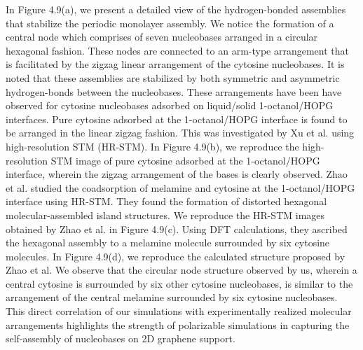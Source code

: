 In Figure 4.9(a), we present a detailed view of the hydrogen-bonded assemblies that stabilize the periodic monolayer assembly. We notice the formation of a central node which comprises of seven nucleobases arranged in a circular hexagonal fashion. These nodes are connected to an arm-type arrangement that is facilitated by the zigzag linear arrangement of the cytosine nucleobases. It is noted that these assemblies are stabilized by both symmetric and asymmetric hydrogen-bonds between the nucleobases. These arrangements have been have observed for cytosine nucleobases adsorbed on liquid/solid 1-octanol/HOPG interfaces.\supercite{zhao_investigating_2016,xu_coadsorption_2006} Pure cytosine adsorbed at the 1-octanol/HOPG interface is found to be arranged in the linear zigzag fashion. This was investigated by Xu et al. using high-resolution STM (HR-STM). In Figure 4.9(b), we reproduce the high-resolution STM image of pure cytosine adsorbed at the 1-octanol/HOPG interface, wherein the zigzag arrangement of the bases is clearly observed.\supercite{xu_coadsorption_2006} Zhao et al. studied the coadsorption of melamine and cytosine at the 1-octanol/HOPG interface using HR-STM. They found the formation of distorted hexagonal molecular-assembled island structures. We reproduce the HR-STM images obtained by Zhao et al. in Figure 4.9(c).\supercite{zhao_investigating_2016} Using DFT calculations, they ascribed the hexagonal assembly to a melamine molecule surrounded by six cytosine molecules. In Figure 4.9(d), we reproduce the calculated structure proposed by Zhao et al.\supercite{zhao_investigating_2016} We observe that the circular node structure observed by us, wherein a central cytosine is surrounded by six other cytosine nucleobases, is similar to the arrangement of the central melamine surrounded by six cytosine nucleobases. This direct correlation of our simulations with experimentally realized molecular arrangements highlights the strength of polarizable simulations in capturing the self-assembly of nucleobases on 2D graphene support.
